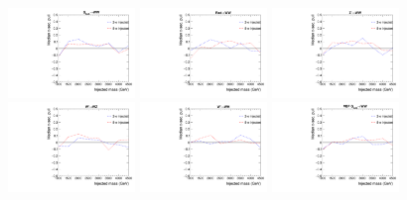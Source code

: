 \begin{figure}[htbp]
  \centering
  \includegraphics[width=0.3\textwidth]{fig/fitValidation/biasSignalSigInject_GbuToWW_median.pdf}
  \includegraphics[width=0.3\textwidth]{fig/fitValidation/biasSignalSigInject_RadToWW_median.pdf}
  \includegraphics[width=0.3\textwidth]{fig/fitValidation/biasSignalSigInject_ZprToWW_median.pdf}\\
  \includegraphics[width=0.3\textwidth]{fig/fitValidation/biasSignalSigInject_WprToWZ_median.pdf}
  \includegraphics[width=0.3\textwidth]{fig/fitValidation/biasSignalSigInject_WprToWH_median.pdf}
  \includegraphics[width=0.3\textwidth]{fig/fitValidation/biasSignalSigInject_VBFGbuToWW_median.pdf}\\

\end{figure}
